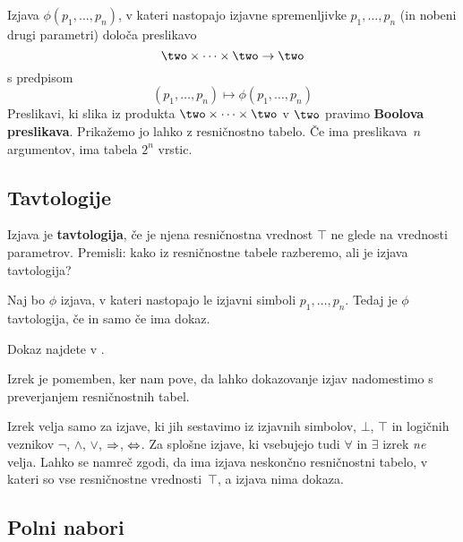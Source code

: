 Izjava $\phi(p_1, \ldots, p_n)$, v kateri nastopajo izjavne spremenljivke $p_1, \ldots, p_n$ (in nobeni drugi parametri) določa preslikavo
%
\begin{equation*}
  \two \times \cdots \times \two \to \two
\end{equation*}
%
s predpisom
%
\begin{equation*}
    (p_1, \ldots, p_n) \mapsto \phi(p_1, \ldots, p_n)
\end{equation*}
%
Preslikavi, ki slika iz produkta $\two \times \cdots \times \two$ v $\two$ pravimo \textbf{Boolova preslikava}. Prikažemo jo lahko z resničnostno tabelo. Če ima preslikava~$n$ argumentov, ima tabela $2^n$ vrstic.


\subsection{Tavtologije}

Izjava je \textbf{tavtologija}, če je njena resničnostna vrednost $\top$ ne glede na
vrednosti parametrov. Premisli: kako iz resničnostne tabele razberemo, ali je
izjava tavtologija?

\begin{izrek}
  Naj bo $\phi$ izjava, v kateri nastopajo le izjavni simboli
  $p_1,\ldots,p_n$. Tedaj je $\phi$ tavtologija, če in samo če ima dokaz.
\end{izrek}

\begin{dokaz}
  Dokaz najdete v \cite{prijatelj92:_osnov}.
\end{dokaz}

\noindent
%
Izrek je pomemben, ker nam pove, da lahko dokazovanje izjav nadomestimo s preverjanjem resničnostnih tabel.

\begin{opomba}
  Izrek velja samo za izjave, ki jih sestavimo iz izjavnih simbolov, $\bot$, $\top$ in
  logičnih veznikov $\neg$, $\land$, $\lor$, $\Rightarrow$, $\Leftrightarrow$. Za splošne izjave, ki vsebujejo tudi $\forall$ in $\exists$ izrek \emph{ne} velja. Lahko se namreč zgodi, da ima izjava neskončno resničnostni tabelo, v kateri so vse resničnostne vrednosti~$\top$, a izjava nima dokaza.
\end{opomba}

\subsection{Polni nabori}

